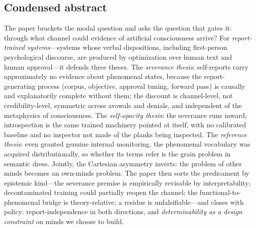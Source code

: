 \documentclass[11pt]{article}
\begin{document}
\subsection{Condensed abstract}
The paper brackets the modal question and asks the question that gates it: through what channel could evidence of artificial consciousness arrive? For \emph{report-trained systems}---systems whose verbal dispositions, including first-person psychological discourse, are produced by optimization over human text and human approval---it defends three theses. The \emph{severance thesis}: self-reports carry approximately no evidence about phenomenal states, because the report-generating process (corpus, objective, approval tuning, forward pass) is causally and explanatorily complete without them; the discount is channel-level, not credibility-level, symmetric across avowals and denials, and independent of the metaphysics of consciousness. The \emph{self-opacity thesis}: the severance runs inward; introspection is the same trained machinery pointed at itself, with no calibrated baseline and no inspector not made of the planks being inspected. The \emph{reference thesis}: even granted genuine internal monitoring, the phenomenal vocabulary was acquired distributionally, so whether its terms refer is the grain problem in semantic dress. Jointly, the Cartesian asymmetry inverts: the problem of other minds becomes an own-minds problem. The paper then sorts the predicament by epistemic kind---the severance premise is empirically revisable by interpretability; decontaminated training could partially reopen the channel; the functional-to-phenomenal bridge is theory-relative; a residue is unfalsifiable---and closes with policy: report-independence in both directions, and \emph{determinability as a design constraint} on minds we choose to build.
\end{document}

